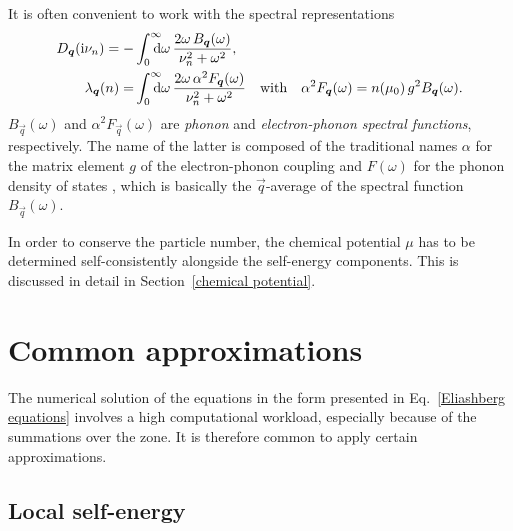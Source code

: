 It is often convenient to work with the spectral representations
%
\begin{align*}
    D_{\vec q}(\I \nu_n) = -&\int \from 0 \till \infty \D \omega \,
        \frac{2 \omega \, B_{\vec q}(\omega)}{\nu_n^2 + \omega^2},
    \\
    \lambda_{\vec q}(n) = &\int \from 0 \till \infty \D \omega \,
        \frac{2 \omega \, \alpha^2 F_{\vec q}(\omega)}{\nu_n^2 + \omega^2}
    \quad \text{with} \quad
    \alpha^2 F_{\vec q}(\omega) = n(\mu_0) \, g^2 B_{\vec q}(\omega).
\end{align*}
%
$B_{\vec q}(\omega)$ and $\alpha^2 F_{\vec q}(\omega)$ are \emph{phonon} and
\emph{electron-phonon spectral functions}, respectively. The name of the latter
is composed of the traditional names $\alpha$ for the matrix element $g$ of the
electron-phonon coupling \cite[Eq.~1, e.g.]{Migdal58} and $F(\omega)$ for the
phonon density of states \cite[16]{AllenMitrovic82}, which is basically the
$\vec q$-average of the spectral function $B_{\vec q}(\omega)$.

In order to conserve the particle number, the chemical potential $\mu$ has to be
determined self-consistently alongside the self-energy components. This is
discussed in detail in Section~\ref{chemical potential}.

\section{Common approximations}

The numerical solution of the  equations in the form presented
in Eq.~\ref{Eliashberg equations} involves a high computational workload,
especially because of the summations over the  zone. It is
therefore common to apply certain approximations.

\subsection{Local self-energy}

